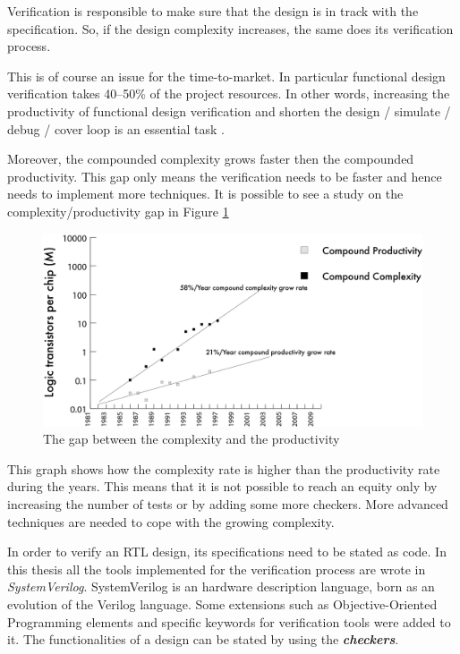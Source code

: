 Verification is responsible to make sure that the design is in track with the specification. So, if the design complexity increases, the same does its verification process.

This is of course an issue for the time-to-market. 
In particular functional design verification takes \mbox{40–50\%} of the project resources. In other words, increasing the productivity of functional design verification and shorten the design / simulate / debug / cover loop is an essential task \cite{verification-book-2018}.

Moreover, the compounded complexity grows faster then the compounded productivity. This gap only means the verification needs to be faster and hence needs to implement more techniques.
It is possible to see a study on the complexity/productivity gap in Figure \ref{complexity-gap}
\begin{figure}[H]
    \centering
    \includegraphics[scale = 0.4]{Chapter_1/img/prod-compl.png}
    \caption{The gap between the complexity and the productivity \cite{verification-book-2018}}
    \label{complexity-gap}
\end{figure}

This graph shows how the complexity rate is higher than the productivity rate during the years. This means that it is not possible to reach an equity only by increasing the number of tests or by adding some more checkers. More advanced techniques are needed to cope with the growing complexity.

In order to verify an RTL design, its specifications need to be stated as code. In this thesis all the tools implemented for the verification process are wrote in \emph{SystemVerilog}. 
SystemVerilog is an hardware description language, born as an evolution of the Verilog language. Some extensions such as Objective-Oriented Programming elements and speciﬁc keywords for verification tools were added to it. The functionalities of a design can be stated by using the \textbf{\emph{checkers}}.

